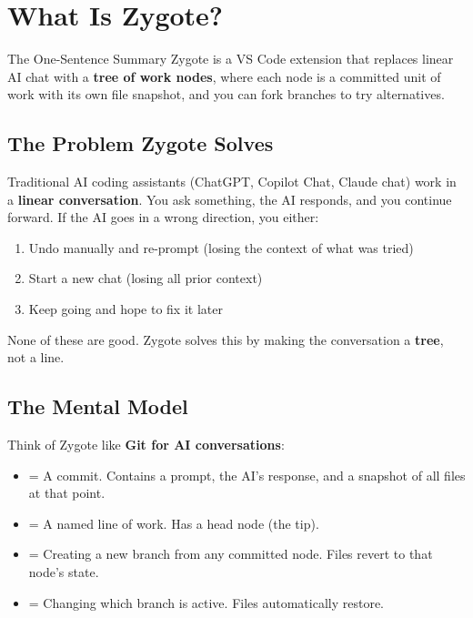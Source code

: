 \documentclass[12pt, a4paper]{article}
\begin{document}
\section{What Is Zygote?}

\begin{conceptbox}{The One-Sentence Summary}
Zygote is a VS Code extension that replaces linear AI chat with a \textbf{tree of work nodes}, where each node is a committed unit of work with its own file snapshot, and you can fork branches to try alternatives.
\end{conceptbox}

\subsection{The Problem Zygote Solves}

Traditional AI coding assistants (ChatGPT, Copilot Chat, Claude chat) work in a \textbf{linear conversation}. You ask something, the AI responds, and you continue forward. If the AI goes in a wrong direction, you either:

\begin{enumerate}[label=(\alph*)]
    \item Undo manually and re-prompt (losing the context of what was tried)
    \item Start a new chat (losing all prior context)
    \item Keep going and hope to fix it later
\end{enumerate}

None of these are good. Zygote solves this by making the conversation a \textbf{tree}, not a line.

\subsection{The Mental Model}

Think of Zygote like \textbf{Git for AI conversations}:

\begin{itemize}[leftmargin=2cm]
    \item[\textbf{Node}] = A commit. Contains a prompt, the AI's response, and a snapshot of all files at that point.
    \item[\textbf{Branch}] = A named line of work. Has a head node (the tip).
    \item[\textbf{Fork}] = Creating a new branch from any committed node. Files revert to that node's state.
    \item[\textbf{Switch}] = Changing which branch is active. Files automatically restore.
\end{itemize}
\end{document}
